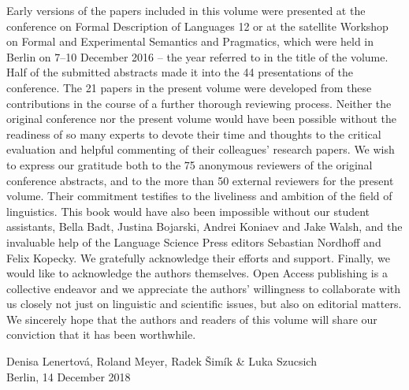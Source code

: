 \begin{refsection}
Early versions of the papers included in this volume were presented at the conference on Formal Description of  Languages 12 or at the satellite Workshop on Formal and Experimental Semantics and Pragmatics, which were held in Berlin on 7--10 December 2016 -- the year referred to in the title of the volume. Half of the submitted abstracts made it into the 44 presentations of the conference. The 21 papers in the present volume were developed from these contributions in the course of a further thorough reviewing process. Neither the original conference nor the present volume would have been possible without the readiness of so many experts to devote their time and thoughts to the critical evaluation and helpful commenting of their colleagues' research papers. We wish to express our gratitude both to the 75 anonymous reviewers of the original conference abstracts, and to the more than 50 external reviewers for the present volume. Their commitment testifies to the liveliness and ambition of the field of  linguistics. This book would have also been impossible without our student assistants, Bella Badt, Justina Bojarski, Andrei Koniaev and Jake Walsh, and the invaluable help of the Language Science Press editors Sebastian Nordhoff and Felix Kopecky. We gratefully acknowledge their efforts and support. Finally, we would like to acknowledge the authors themselves. Open Access publishing is a collective endeavor and we appreciate the authors' willingness to collaborate with us closely not just on linguistic and scientific issues, but also on editorial matters. We sincerely hope that the authors and readers of this volume will share our conviction that it has been worthwhile.

\null\hfill Denisa Lenertová, Roland Meyer, Radek Šimík \& Luka Szucsich\\
\null\hfill Berlin, 14 December 2018
\end{refsection}

